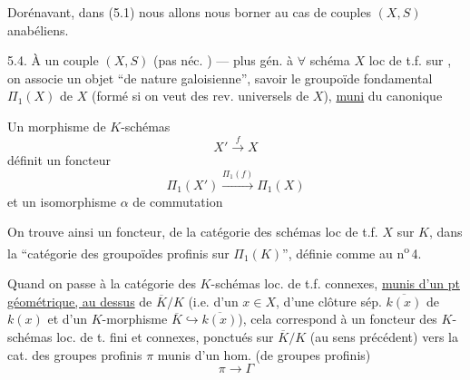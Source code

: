 
Dorénavant, dans (5.1) nous allons nous borner au cas de couples
$(X,S)$ anabéliens.


5.4. À un couple $(X,S)$ (pas néc. ) --- plus gén. à
$\forall$ schéma $X$ loc de t.f. sur , on associe un
objet ``de nature galoisienne'', savoir le groupoïde fondamental
 $\Pi_1(X)$ de $X$ (formé si on veut des rev.
universels de $X$), \uline{muni} du 
 canonique

Un morphisme de $K$-schémas
\[
X' \xrightarrow{f} X
\]
définit un foncteur
\[
\Pi_1(X') \xrightarrow{\Pi_1(f)} \Pi_1(X)
\]
et un isomorphisme $\alpha$ de commutation




On trouve ainsi un foncteur, de la catégorie des schémas loc de t.f.
$X$ sur $K$, dans la ``catégorie des groupoïdes profinis sur
$\Pi_1(K)$'', définie comme au n\textsuperscript{o}\,4.

Quand on passe à la catégorie des $K$-schémas loc. de t.f.
connexes,  \uline{munis d'un pt géométrique,
au dessus} de $\overline K/K$ (i.e. d'un $x\in X$,
 d'une clôture sép. $\overline{k(x)}$ de $k(x)$ et d'un
$K$-morphisme $\overline K\hookrightarrow\overline{k(x)}$), cela correspond
à un foncteur des $K$-schémas loc. de t. fini et connexes, ponctués sur
$\overline K/K$ (au sens précédent) vers la cat. des
 groupes profinis  $\pi$
munis d'un hom. (de groupes profinis)
\[
\pi\longrightarrow\Gamma
\]



